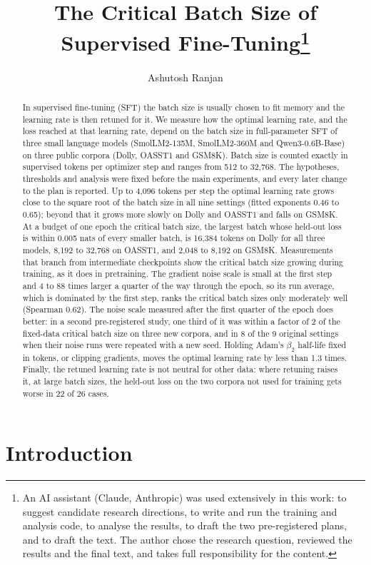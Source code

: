 \documentclass[10pt]{article}
\title{The Critical Batch Size of Supervised Fine-Tuning\thanks{An AI assistant (Claude, Anthropic) was used extensively in this work: to suggest candidate research directions, to write and run the training and analysis code, to analyse the results, to draft the two pre-registered plans, and to draft the text. The author chose the research question, reviewed the results and the final text, and takes full responsibility for the content.}}
\author{\name Ashutosh Ranjan}
\begin{document}
\maketitle

\begin{abstract}
In supervised fine-tuning (SFT) the batch size is usually chosen to fit memory and the learning rate is then retuned for it. We measure how the optimal learning rate, and the loss reached at that learning rate, depend on the batch size in full-parameter SFT of three small language models (SmolLM2-135M, SmolLM2-360M and Qwen3-0.6B-Base) on three public corpora (Dolly, OASST1 and GSM8K). Batch size is counted exactly in supervised tokens per optimizer step and ranges from 512 to 32,768. The hypotheses, thresholds and analysis were fixed before the main experiments, and every later change to the plan is reported. Up to 4,096 tokens per step the optimal learning rate grows close to the square root of the batch size in all nine settings (fitted exponents 0.46 to 0.65); beyond that it grows more slowly on Dolly and OASST1 and falls on GSM8K. At a budget of one epoch the critical batch size, the largest batch whose held-out loss is within 0.005 nats of every smaller batch, is 16,384 tokens on Dolly for all three models, 8,192 to 32,768 on OASST1, and 2,048 to 8,192 on GSM8K. Measurements that branch from intermediate checkpoints show the critical batch size growing during training, as it does in pretraining. The gradient noise scale is small at the first step and 4 to 88 times larger a quarter of the way through the epoch, so its run average, which is dominated by the first step, ranks the critical batch sizes only moderately well (Spearman 0.62). The noise scale measured after the first quarter of the epoch does better: in a second pre-registered study, one third of it was within a factor of 2 of the fixed-data critical batch size on three new corpora, and in 8 of the 9 original settings when their noise runs were repeated with a new seed. Holding Adam's $\beta_2$ half-life fixed in tokens, or clipping gradients, moves the optimal learning rate by less than 1.3 times. Finally, the retuned learning rate is not neutral for other data: where retuning raises it, at large batch sizes, the held-out loss on the two corpora not used for training gets worse in 22 of 26 cases.
\end{abstract}

\section{Introduction}
\end{document}

